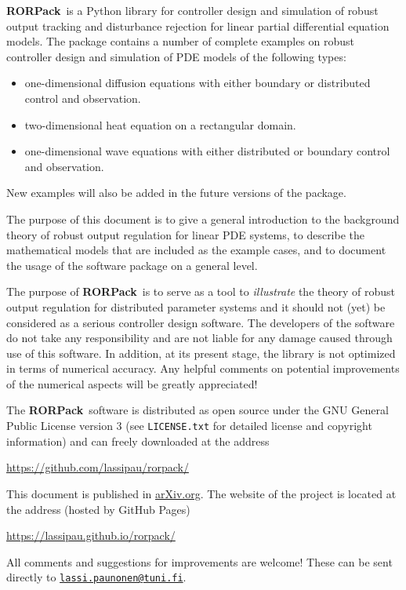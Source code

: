 \documentclass[11pt, a4paper]{amsart}
\newcommand{\COMMapproxRC}[1]{{\color{gray}#1}}
\renewcommand{\COMMapproxRC}[1]{}
\theoremstyle{definition}
\numberwithin{equation}{section}
\newcommand{\RORname}{\textbf{RORPack}}
\newcommand{\shorten}[1]{{\color{gray}#1}}
\renewcommand{\shorten}[1]{}
\begin{document}
\RORname\ is a Python library
for controller design and simulation of robust output tracking and disturbance rejection for linear partial differential equation models. 
The package contains a number of complete examples on robust controller design and simulation of PDE models
of the following types:
\begin{itemize}
  \item one-dimensional diffusion equations with either boundary or distributed control and observation.
  \item two-dimensional heat equation on a rectangular domain.
  \item one-dimensional wave equations with either distributed or boundary control and observation.
    \COMMapproxRC{
    \item two-dimensional wave equation on an annulus with boundary control and observation
    }
\end{itemize}
New examples will also be added in the future versions of the package.

The purpose of this document is to give a general introduction to the background theory of robust output regulation for linear PDE systems, to describe the mathematical models that are included as the example cases, and to document the usage of the software package on a general level.
 
The purpose of \RORname\ is to serve as a tool to \textit{illustrate} the theory of robust output regulation for distributed parameter systems and it should not (yet) be considered as a serious controller design software. 
The developers of the software do not take any responsibility and are not liable for any damage caused through use of this software.
In addition, at its present stage, the library is not optimized in terms of numerical accuracy. Any helpful comments on potential improvements of the numerical aspects will be greatly appreciated!

The \RORname\ software is distributed as open source under the GNU General Public License version 3 (see \texttt{LICENSE.txt} for detailed license and copyright information) and can freely downloaded at the address
\begin{center}
  \href{https://github.com/lassipau/rorpack/}{https://github.com/lassipau/rorpack/}
\end{center}
  This document is published in \href{https://arxiv.org/}{arXiv.org}.
The website of the project is located at the address (hosted by GitHub Pages)
\begin{center}
  \href{https://lassipau.github.io/rorpack/}{https://lassipau.github.io/rorpack/}
\end{center}
All comments and suggestions for improvements are welcome! These can be sent directly to \texttt{\href{mailto:lassi.paunonen@tuni.fi}{lassi.paunonen@tuni.fi}}.
\end{document}
